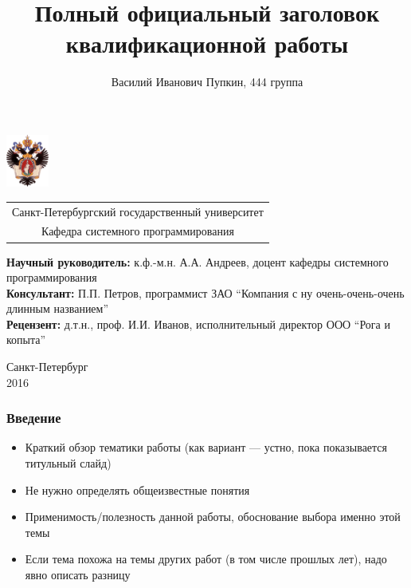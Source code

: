 \documentclass{beamer}
\title[Короткое название]{Полный официальный заголовок квалификационной работы}
\institute[СПбГУ]{}
\author[Василий Пупкин]{Василий Иванович Пупкин, 444 группа}
\begin{document}
{
\begin{frame}
  \includegraphics[width=1.4cm]{pictures/SPbGU_Logo.png}
\vspace{-35pt}
\hspace{-10pt}
\begin{center}
   \begin{tabular}{c}
        \scriptsize{Санкт-Петербургский государственный университет} \\
        \scriptsize{Кафедра системного программирования}
    \end{tabular}
\titlepage
\end{center}

\btVFill

{\scriptsize
   {\bfseries Научный руководитель:} к.ф.-м.н. А.А. Андреев, доцент кафедры системного программирования \\
   {\bfseries Консультант:}  П.П. Петров, программист ЗАО ``Компания с ну очень-очень-очень длинным названием''\\
   {\bfseries Рецензент:} д.т.н., проф. И.И. Иванов, исполнительный директор ООО ``Рога и копыта''  
 }
\begin{center}
  \vspace{5pt}
  \scriptsize{Санкт-Петербург\\
                 2016}
  \end{center}

\end{frame}
}

\begin{frame}[fragile]  
  \frametitle{Введение}
  \begin{itemize}
    \item Краткий обзор тематики работы (как вариант --- устно, пока показывается титульный слайд)
    \item Не нужно определять общеизвестные понятия
    \item Применимость/полезность данной работы, обоснование выбора именно этой темы 
    \item Если тема похожа на темы других работ (в том числе прошлых лет), надо явно описать разницу
  \end{itemize}
\end{frame}
            
\end{document}

